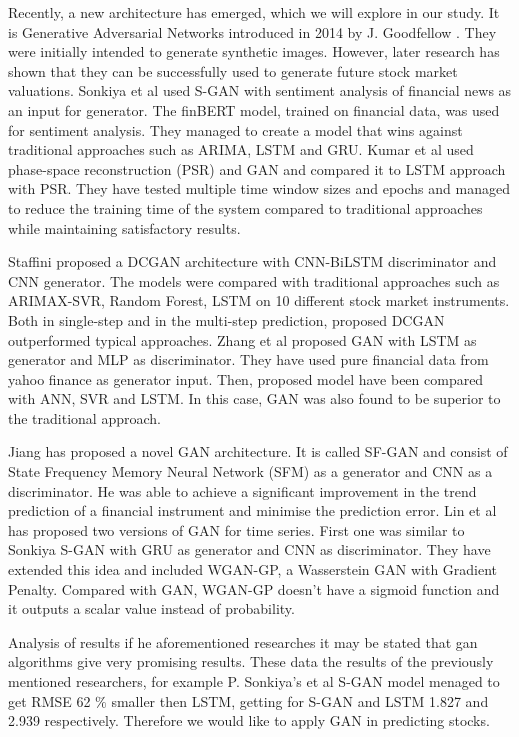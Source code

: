\documentclass[11pt]{article} %
\begin{document}
Recently, a new architecture has emerged, which we will explore in our study. It is Generative Adversarial Networks introduced in 2014 by J. Goodfellow \cite{gan1}. They were initially intended to generate synthetic images. However, later research has shown that they can be successfully used to generate future stock market valuations. Sonkiya et al \cite{s-gan} used S-GAN with sentiment analysis of financial news as an input for generator. The finBERT model, trained on financial data, was used for sentiment analysis. They managed to create a model that wins against traditional approaches such as ARIMA, LSTM and GRU. Kumar et al  \cite{gan-stock} used phase-space reconstruction (PSR) and GAN and compared it to LSTM approach with PSR. They have tested multiple time window sizes and epochs and managed to reduce the training time of the system compared to traditional approaches while maintaining satisfactory results. 

Staffini \cite{gan-cnn} proposed a DCGAN architecture with CNN-BiLSTM discriminator and CNN generator. The models were compared with traditional approaches such as ARIMAX-SVR, Random Forest, LSTM on 10 different stock market instruments. Both in single-step and in the multi-step prediction, proposed DCGAN outperformed typical approaches. Zhang et al \cite{gan-zhang} proposed GAN with LSTM as generator and MLP as discriminator. They have used pure financial data from yahoo finance as generator input. Then, proposed model have been compared with ANN, SVR and LSTM. In this case, GAN was also found to be superior to the traditional approach.  

Jiang \cite{gan-Jjang} has proposed a novel GAN architecture. It is called SF-GAN and consist of 
State Frequency Memory Neural Network (SFM) as a generator and CNN as a discriminator. 
He was able to achieve a significant improvement in the trend prediction of a financial instrument and minimise the prediction error.  Lin et al \cite{gan-lin} has proposed two versions of GAN for time series. First one was similar to Sonkiya S-GAN with GRU as generator and CNN as discriminator. They have extended this idea and included WGAN-GP, a Wasserstein GAN with Gradient Penalty. Compared with GAN, WGAN-GP doesn't have a sigmoid function and it outputs a scalar value instead of probability. 

Analysis of results if he aforementioned researches it may be stated that gan algorithms give very promising results. These data the results of the previously mentioned researchers, for example P. Sonkiya's et al S-GAN model menaged to get RMSE 62 $\% $ smaller then LSTM, getting for S-GAN and LSTM 1.827 and 2.939 respectively. Therefore we would like to apply GAN in predicting stocks. 
\end{document}
